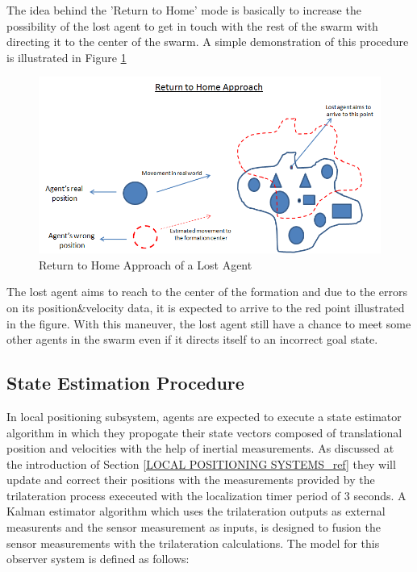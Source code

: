 The idea behind the 'Return to Home' mode is basically to increase the possibility of the lost agent to get in touch with the rest of the swarm with directing it to the center of the swarm. A simple demonstration of this procedure is illustrated in Figure \ref{return_home_ref}
	
\begin{figure}[H]
\caption{Return to Home Approach of a Lost Agent} \label{return_home_ref}
\centering
\includegraphics[scale = 0.60]{return_home}
\end{figure}
	
The lost agent aims to reach to the center of the formation and due to the errors on its position$\&$velocity data, it is expected to arrive to the red point illustrated in the figure. With this maneuver, the lost agent still have a chance to meet some other agents in the swarm even if it directs itself to an incorrect goal state.
	
\subsection{State Estimation Procedure}
In local positioning subsystem, agents are expected to execute a state estimator algorithm in which they propogate their state vectors composed of translational position and velocities with the help of inertial measurements. As discussed at the introduction of Section \ref{LOCAL POSITIONING SYSTEMS_ref} they will update and correct their positions with the measurements provided by the trilateration process execeuted with the localization timer period of 3 seconds. A Kalman estimator algorithm which uses the trilateration outputs as external measurents and the sensor measurement as inputs, is designed to fusion the sensor measurements with the trilateration calculations. The model for this observer system is defined as follows:
	

